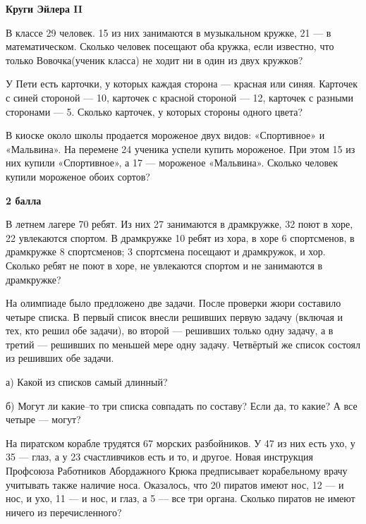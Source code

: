 \centerline{\bf \Huge Круги Эйлера II}



 В классе 29 человек. 15 из них занимаются в музыкальном кружке, 21 — в математическом. Сколько человек посещают оба кружка, если известно, что только Вовочка(ученик класса) не ходит ни в один из двух кружков?


 У Пети есть карточки, у которых каждая сторона — красная или синяя.
Карточек с синей стороной — 10, карточек с красной стороной — 12, карточек
с разными сторонами — 5. Сколько карточек, у которых стороны одного цвета? 

 В киоске около школы продается мороженое двух видов:
«Спортивное» и «Мальвина». На перемене 24 ученика успели купить мороженое. При этом 15 из них купили «Спортивное», а 17 — мороженое «Мальвина». Сколько человек купили мороженое обоих сортов?

\begin{flushright} \textbf{2 балла}\\ 
\end{flushright}


 В летнем лагере 70 ребят. Из них 27 занимаются в драмкружке,
32 поют в хоре, 22 увлекаются спортом. В драмкружке 10 ребят из хора, в хоре 6 спортсменов,
в драмкружке 8 спортсменов; 3 спортсмена посещают и драмкружок, и хор. Сколько ребят не
поют в хоре, не увлекаются спортом и не занимаются в драмкружке?

На олимпиаде было предложено две задачи. После проверки жюри составило четыре списка. В первый список внесли решивших первую задачу (включая и тех, кто решил обе задачи), во второй — решивших только одну задачу, а в третий — решивших по меньшей мере одну задачу. Четвёртый же список состоял из решивших обе задачи.

а) Какой из списков самый длинный?

б) Могут ли какие–то три списка совпадать по составу? Если да, то какие? А все четыре — могут?


 На пиратском корабле трудятся 67 морских разбойников. У 47 из них есть
ухо, у 35 — глаз, а у 23 счастливчиков есть и то, и другое. Новая инструкция
Профсоюза Работников Абордажного Крюка предписывает корабельному врачу
учитывать также наличие носа. Оказалось, что 20 пиратов имеют нос, 12 — и
нос, и ухо, 11 — и нос, и глаз, а 5 — все три органа. Сколько пиратов не имеют
ничего из перечисленного?

